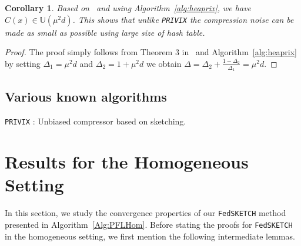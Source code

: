 \documentclass[twoside]{article}
\newtheorem{corollary}{Corollary}
\begin{document}
\begin{corollary}
Based on~\cite[Theorem 3]{horvath2020better} and using Algorithm~\ref{alg:heaprix}, we have $C(x)\in \mathbb{U}(\mu^2 d)$. This shows that unlike \texttt{PRIVIX} the compression noise can be made as small as possible using large size of hash table.
\end{corollary}

\begin{proof}
The proof simply follows from Theorem 3 in~\cite{horvath2020better} and Algorithm~\ref{alg:heaprix} by setting $\Delta_1=\mu^2d$ and $\Delta_2=1+\mu^2d$ we obtain $\Delta=\Delta_2+\frac{1-\Delta_2}{\Delta_1}=\mu^2d$.
\end{proof}


\subsection{Various known algorithms}

\begin{algorithm}[H]
\caption{\texttt{PRIVIX} \cite{li2019privacy}: Unbiased compressor based on sketching. }\label{Alg:privix}
\begin{algorithmic}[1]
\vspace{- 0.1cm}
\end{algorithmic}
\end{algorithm}





\section{Results for the Homogeneous Setting}
\label{sec:app:sgd:undrr-pl}



In this section, we study the convergence properties of our  \texttt{FedSKETCH} method presented in Algorithm~\ref{Alg:PFLHom}. Before stating the proofs for \texttt{FedSKETCH} in the homogeneous setting, we first mention the following intermediate lemmas. 
\end{document}
